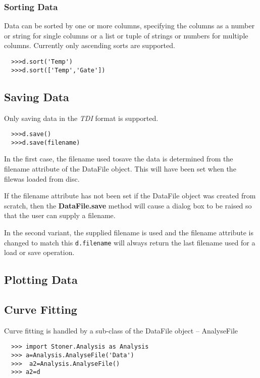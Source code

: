 \documentclass[a4paper,11pt]{scrartcl}
\begin{document}
\subsubsection{Sorting Data}

Data can be sorted by one or more columns, specifying the columns as a number or string for single columns or a list or tuple of strings or numbers for multiple columns. Currently only ascending sorts are supported.

\begin{verbatim}
  >>>d.sort('Temp')
  >>>d.sort(['Temp','Gate'])
\end{verbatim}

\subsection{Saving Data}

Only saving data in the \textit{TDI} format is supported.

\begin{verbatim}
  >>>d.save()
  >>>d.save(filename)
\end{verbatim}

In the first case, the filename used tosave the data is determined from the filename attribute of the DataFile object. This will have been set when the filewas loaded from disc.

If the filename attribute has not been set \eg if the DataFile object was created from scratch, then the \textbf{DataFile.save} method will cause a dialog box to be raised so that the user can supply a filename.

In the second variant, the supplied filename is used and the filename attribute is changed to match this \ie \verb#d.filename# will always return the last filename used for a load or save operation.

\subsection{Plotting Data}

\subsection{Curve Fitting}

Curve fitting is handled by a sub-class of the DataFile object -- AnalyseFile

\begin{verbatim}
  >>> import Stoner.Analysis as Analysis
  >>> a=Analysis.AnalyseFile('Data')
  >>>  a2=Analysis.AnalyseFile()
  >>> a2=d
\end{verbatim}
\end{document}
